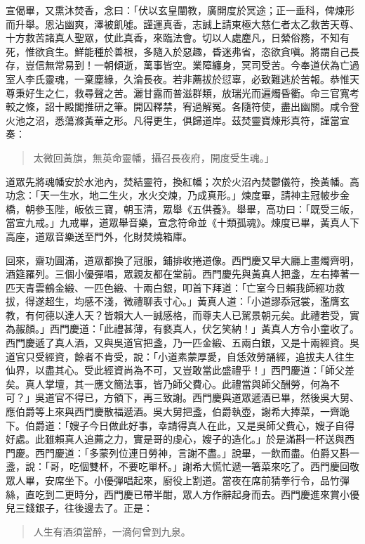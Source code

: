 宣偈畢，又熏沐焚香，念曰：「伏以玄皇闡教，廣開度於冥途；正一垂科，俾煉形而升舉。恩沾幽爽，澤被飢噓。謹運真香，志誠上請東極大慈仁者太乙救苦天尊、十方救苦諸真人聖眾，仗此真香，來臨法會。切以人處塵凡，日縈俗務，不知有死，惟欲貪生。鮮能種於善根，多隨入於惡趣，昏迷弗省，恣欲貪嗔。將謂自己長存，豈信無常易到！一朝傾逝，萬事皆空。業障纏身，冥司受苦。今奉道伏為亡過室人李氏靈魂，一棄塵緣，久淪長夜。若非薦拔於愆辜，必致難逃於苦報。恭惟天尊秉好生之仁，救尋聲之苦。灑甘露而普滋群類，放瑞光而遍燭昏衢。命三官寬考較之條，詔十殿閣推研之筆。開囚釋禁，宥過解冤。各隨符使，盡出幽關。咸令登火池之沼，悉蕩滌黃華之形。凡得更生，俱歸道岸。茲焚靈寶煉形真符，謹當宣奏：
\begin{quote}
太微回黃旗，無英命靈幡，攝召長夜府，開度受生魂。」
\end{quote}

道眾先將魂幡安於水池內，焚結靈符，換紅幡；次於火沼內焚鬱儀符，換黃幡。高功念：「天一生水，地二生火，水火交煉，乃成真形。」煉度畢，請神主冠帔步金橋，朝參玉陛，皈依三寶，朝玉清，眾舉《五供養》。舉畢，高功曰：「既受三皈，當宣九戒。」九戒畢，道眾舉音樂，宣念符命並《十類孤魂》。煉度已畢，黃真人下高座，道眾音樂送至門外，化財焚燒箱庫。

回來，齋功圓滿，道眾都換了冠服，鋪排收捲道像。西門慶又早大廳上畫燭齊明，酒筵羅列。三個小優彈唱，眾親友都在堂前。西門慶先與黃真人把盞，左右捧著一匹天青雲鶴金緞、一匹色緞、十兩白銀，叩首下拜道：「亡室今日賴我師經功救拔，得遂超生，均感不淺，微禮聊表寸心。」黃真人道：「小道謬忝冠裳，濫膺玄教，有何德以達人天？皆賴大人一誠感格，而尊夫人已駕景朝元矣。此禮若受，實為赧顏。」西門慶道：「此禮甚薄，有褻真人，伏乞笑納！」黃真人方令小童收了。西門慶遞了真人酒，又與吳道官把盞，乃一匹金緞、五兩白銀，又是十兩經資。吳道官只受經資，餘者不肯受，說：「小道素蒙厚愛，自恁效勞誦經，追拔夫人往生仙界，以盡其心。受此經資尚為不可，又豈敢當此盛禮乎！」西門慶道：「師父差矣。真人掌壇，其一應文簡法事，皆乃師父費心。此禮當與師父酬勞，何為不可？」吳道官不得已，方領下，再三致謝。西門慶與道眾遞酒已畢，然後吳大舅、應伯爵等上來與西門慶散福遞酒。吳大舅把盞，伯爵執壺，謝希大捧菜，一齊跪下。伯爵道：「嫂子今日做此好事，幸請得真人在此，又是吳師父費心，嫂子自得好處。此雖賴真人追薦之力，實是哥的虔心，嫂子的造化。」於是滿斟一杯送與西門慶。西門慶道：「多蒙列位連日勞神，言謝不盡。」說畢，一飲而盡。伯爵又斟一盞，說：「哥，吃個雙杯，不要吃單杯。」謝希大慌忙遞一箸菜來吃了。西門慶回敬眾人畢，安席坐下。小優彈唱起來，廚役上割道。當夜在席前猜拳行令，品竹彈絲，直吃到二更時分，西門慶已帶半酣，眾人方作辭起身而去。西門慶進來賞小優兒三錢銀子，往後邊去了。正是：
\begin{quote}
人生有酒須當醉，一滴何曾到九泉。
\end{quote}
